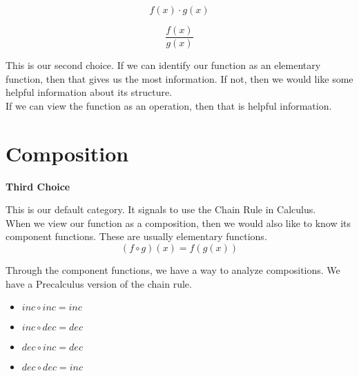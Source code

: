 \documentclass{ximera}
\begin{document}
\[
f(x) \cdot g(x)
\]


\[
\frac{f(x)}{g(x)}
\]





This is our second choice.  If we can identify our function as an elementary function, then that gives us the most information. If not, then we would like some helpful information about its structure. \\



If we can view the function as an operation, then that is helpful information.\\







































\section*{Composition}


\textbf{\textcolor{purple!85!blue}{Third Choice}} 

This is our default category.  It signals to use the Chain Rule in Calculus. \\


When we view our function as a composition, then we would also like to know its component functions. These are usually elementary functions. \\



\[
(f \circ g)(x) = f(g(x))
\]



Through the component functions, we have a way to analyze compositions.  We have a Precalculus version of the chain rule.


\begin{itemize}
\item  $inc \circ inc = inc$
\item  $inc \circ dec = dec$
\item  $dec \circ inc = dec$
\item  $dec \circ dec = inc$
\end{itemize}
\end{document}
